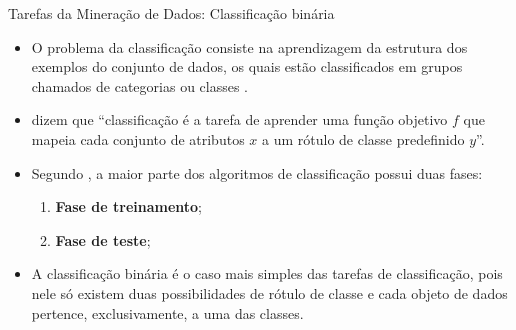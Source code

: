\documentclass[%
  10pt,%
  aspectratio = 169,%
  compress,%
  t,%
]{beamer}%
\begin{document}
    \begin{frame}[fragile = singleslide]{}{Tarefas da Mineração de Dados: Classificação binária}
        \begin{itemize}
            \item O problema da classificação consiste na aprendizagem da estrutura dos exemplos do conjunto de dados, os quais estão classificados em grupos chamados de categorias ou classes \cite[p.~285]{Aggarwal_DMTT_2015}.

            \item \cite[p.~146, tradução nossa]{TanIDM2014} dizem que ``classificação é a tarefa de aprender uma função objetivo $f$ que mapeia cada conjunto de atributos $x$ a um rótulo de classe predefinido $y$''.

            \item Segundo \cite[p.~286]{Aggarwal_DMTT_2015}, a maior parte dos algoritmos de classificação possui duas fases:
            \begin{enumerate}
                \item \textbf{Fase de treinamento};
                \item \textbf{Fase de teste};
            \end{enumerate}

            \item A classificação binária é o caso mais simples das tarefas de classificação, pois nele só existem duas possibilidades de rótulo de classe e cada objeto de dados pertence, exclusivamente, a uma das classes.
        \end{itemize}
    \end{frame}
\end{document}
